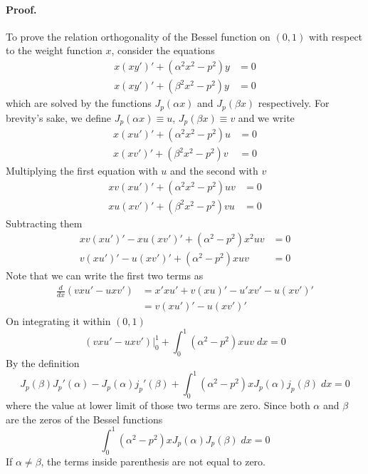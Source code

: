 \documentclass[../../../main.tex]{subfiles}
\begin{document}
\paragraph*{Proof.} To prove the relation orthogonality of the Bessel function on $(0,1)$ with respect to the weight function $x$, consider the equations
\begin{align*}
    x(xy')'+(\alpha^2x^2-p^2)y & =0 \\
    x(xy')'+(\beta^2x^2-p^2)y  & =0
\end{align*}
which are solved by the functions $J_p(\alpha x)$ and $J_p(\beta x)$ respectively.
For brevity's sake, we define $J_p(\alpha x)\equiv u$,  $J_p(\beta x)\equiv v$ and we write
\begin{align*}
    x(xu')'+(\alpha^2x^2-p^2)u & =0 \\
    x(xv')'+(\beta^2x^2-p^2)v  & =0
\end{align*}
Multiplying the first equation with $u$ and the second with $v$
\begin{align*}
    xv(xu')'+(\alpha^2x^2-p^2)uv & =0 \\
    xu(xv')'+(\beta^2x^2-p^2)vu  & =0
\end{align*}
Subtracting them
\begin{align*}
    xv(xu')'-xu(xv')'+(\alpha^2-p^2)x^2uv & =0 \\
    v(xu')'-u(xv')'+(\alpha^2-p^2)xuv     & =0
\end{align*}
Note that we can write the first two terms as
\begin{align*}
    \frac{d}{dx}\left(vxu'-uxv'\right) & =x'xu'+v(xu)'-u'xv'-u(xv')' \\
                                       & =v(xu')'-u(xv')'
\end{align*}
On integrating it within $(0,1)$
\begin{equation*}
    \left(vxu'-uxv'\right)\bigg|_0^1+\int_{0}^{1}(\alpha^2-p^2)xuv\;dx=0
\end{equation*}
By the definition
\begin{equation*}
    J_p(\beta)J_p'(\alpha) -J_p(\alpha)j_p'(\beta) +\int_{0}^{1}(\alpha^2-p^2)xJ_p(\alpha)j_p(\beta)\;dx=0
\end{equation*}
where the value at lower limit of those two terms are zero.
Since both $\alpha$ and $\beta$ are the zeros of the Bessel functions
\begin{equation*}
    \int_{0}^{1}(\alpha^2-p^2)xJ_p(\alpha)J_p(\beta)\;dx=0
\end{equation*}
If $\alpha\neq\beta$, the terms inside parenthesis are not equal to zero.
\end{document}
